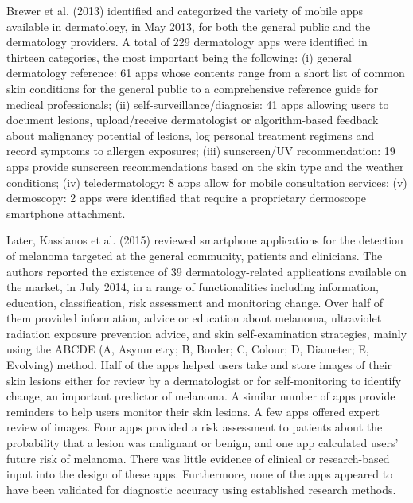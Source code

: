     Brewer et al. (2013) identified and categorized the variety of mobile apps available in dermatology, in May 2013, for both the general public and the dermatology providers. A total of 229 dermatology apps were identified in thirteen categories, the most important being the following: (i) general dermatology reference: 61 apps whose contents range from a short list of common skin conditions for the general public to a comprehensive reference guide for medical professionals; (ii) self-surveillance/diagnosis: 41 apps allowing users to document lesions, upload/receive dermatologist or algorithm-based feedback about malignancy potential of lesions, log personal treatment regimens and record symptoms to allergen exposures; (iii) sunscreen/UV recommendation: 19 apps provide sunscreen recommendations based on the skin type and the weather conditions; (iv) teledermatology: 8 apps allow for mobile consultation services; (v) dermoscopy: 2 apps were identified that require a proprietary dermoscope smartphone attachment.
    
    Later, Kassianos et al. (2015) reviewed smartphone applications for the detection of melanoma targeted at the general community, patients and clinicians. The authors reported the existence of 39 dermatology-related applications available on the market, in July 2014, in a range of functionalities including information, education, classification, risk assessment and monitoring change. Over half of them provided information, advice or education about melanoma, ultraviolet radiation exposure prevention advice, and skin self-examination strategies, mainly using the ABCDE (A, Asymmetry; B, Border; C, Colour; D, Diameter; E, Evolving) method. Half of the apps helped users take and store images of their skin lesions either for review by a dermatologist or for self-monitoring to identify change, an important predictor of melanoma. A similar number of apps provide reminders to help users monitor their skin lesions. A few apps offered expert review of images. Four apps provided a risk assessment to patients about the probability that a lesion was malignant or benign, and one app calculated users’ future risk of melanoma. There was little evidence of clinical or research-based input into the design of these apps. Furthermore, none of the apps appeared to have been validated for diagnostic accuracy using established research methods.
    
